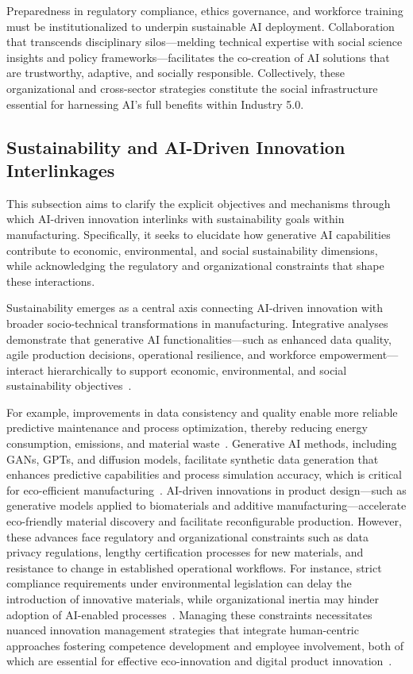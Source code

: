 \documentclass[sigconf]{acmart}
\begin{document}
Preparedness in regulatory compliance, ethics governance, and workforce training must be institutionalized to underpin sustainable AI deployment. Collaboration that transcends disciplinary silos—melding technical expertise with social science insights and policy frameworks—facilitates the co-creation of AI solutions that are trustworthy, adaptive, and socially responsible. Collectively, these organizational and cross-sector strategies constitute the social infrastructure essential for harnessing AI’s full benefits within Industry 5.0.

\subsection{Sustainability and AI-Driven Innovation Interlinkages}

This subsection aims to clarify the explicit objectives and mechanisms through which AI-driven innovation interlinks with sustainability goals within manufacturing. Specifically, it seeks to elucidate how generative AI capabilities contribute to economic, environmental, and social sustainability dimensions, while acknowledging the regulatory and organizational constraints that shape these interactions.

Sustainability emerges as a central axis connecting AI-driven innovation with broader socio-technical transformations in manufacturing. Integrative analyses demonstrate that generative AI functionalities—such as enhanced data quality, agile production decisions, operational resilience, and workforce empowerment—interact hierarchically to support economic, environmental, and social sustainability objectives~\cite{ref5}.

For example, improvements in data consistency and quality enable more reliable predictive maintenance and process optimization, thereby reducing energy consumption, emissions, and material waste~\cite{ref11,ref36}. Generative AI methods, including GANs, GPTs, and diffusion models, facilitate synthetic data generation that enhances predictive capabilities and process simulation accuracy, which is critical for eco-efficient manufacturing~\cite{ref11}. AI-driven innovations in product design—such as generative models applied to biomaterials and additive manufacturing—accelerate eco-friendly material discovery and facilitate reconfigurable production. However, these advances face regulatory and organizational constraints such as data privacy regulations, lengthy certification processes for new materials, and resistance to change in established operational workflows. For instance, strict compliance requirements under environmental legislation can delay the introduction of innovative materials, while organizational inertia may hinder adoption of AI-enabled processes~\cite{ref14,ref21}. Managing these constraints necessitates nuanced innovation management strategies that integrate human-centric approaches fostering competence development and employee involvement, both of which are essential for effective eco-innovation and digital product innovation~\cite{ref14,ref21}.
\end{document}

